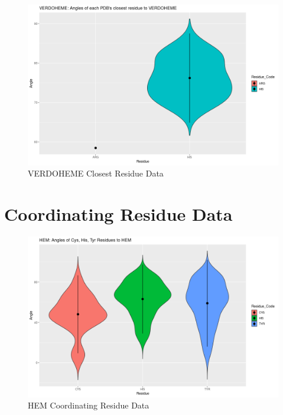 	\begin{figure}
		\caption{VERDOHEME Closest Residue Data}
		\label{figs:VERDOHEME_closestRes7}
		\includegraphics[width=\linewidth]{7A/VERDOHEME_closestRes}
	\end{figure}


\section{Coordinating Residue Data}
	\begin{figure}
		\caption{HEM Coordinating Residue Data}
		\label{figs:HEM_coordRes7}
		\includegraphics[width=\linewidth]{7A/HEM_coordRes}
	\end{figure}
	
